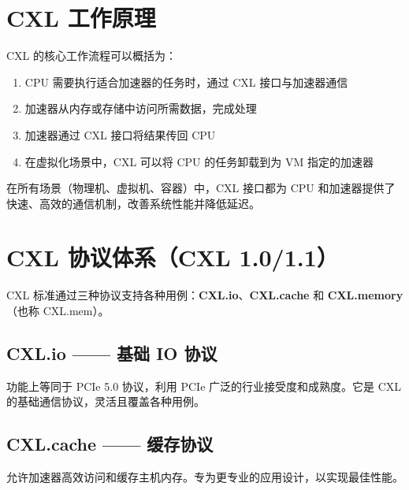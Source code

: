 \documentclass[12pt,a4paper]{article}
\begin{document}
\section{CXL 工作原理}

\begin{analysisbox}
CXL 的核心工作流程可以概括为：

\begin{enumerate}[label=(\arabic*)]
    \item CPU 需要执行适合加速器的任务时，通过 CXL 接口与加速器通信
    \item 加速器从内存或存储中访问所需数据，完成处理
    \item 加速器通过 CXL 接口将结果传回 CPU
    \item 在虚拟化场景中，CXL 可以将 CPU 的任务卸载到为 VM 指定的加速器
\end{enumerate}

在所有场景（物理机、虚拟机、容器）中，CXL 接口都为 CPU 和加速器提供了快速、高效的通信机制，改善系统性能并降低延迟。
\end{analysisbox}

\section{CXL 协议体系（CXL 1.0/1.1）}

CXL 标准通过三种协议支持各种用例：\textbf{CXL.io}、\textbf{CXL.cache} 和 \textbf{CXL.memory}（也称 CXL.mem）。

\subsection{CXL.io —— 基础 IO 协议}

\begin{keypoint}[CXL.io]
功能上等同于 PCIe 5.0 协议，利用 PCIe 广泛的行业接受度和成熟度。它是 CXL 的基础通信协议，灵活且覆盖各种用例。
\end{keypoint}

\subsection{CXL.cache —— 缓存协议}

\begin{keypoint}
允许加速器高效访问和缓存主机内存。专为更专业的应用设计，以实现最佳性能。
\end{keypoint}
\end{document}
